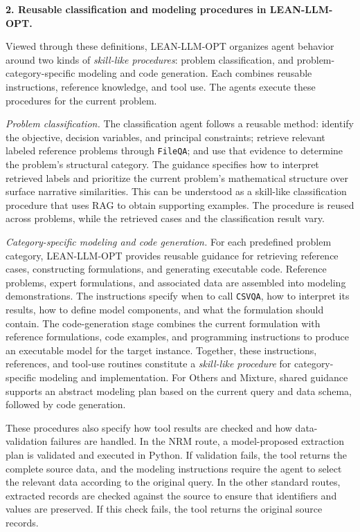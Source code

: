 {\medskip
\noindent\textbf{2. Reusable classification and modeling procedures in LEAN-LLM-OPT.}

Viewed through these definitions, LEAN-LLM-OPT organizes agent
behavior around two kinds of \emph{skill-like procedures}:
problem classification, and problem-category-specific modeling
and code generation. Each combines reusable instructions,
reference knowledge, and tool use. The agents execute these
procedures for the current problem.

\emph{Problem classification.}
The classification agent follows a reusable method: identify the
objective, decision variables, and principal constraints; retrieve
relevant labeled reference problems through \texttt{FileQA}; and
use that evidence to determine the problem's structural category.
The guidance specifies how to interpret retrieved labels and
prioritize the current problem's mathematical structure over
surface narrative similarities. This can be understood as a
skill-like classification procedure that uses RAG to obtain
supporting examples. The procedure is reused across problems,
while the retrieved cases and the classification result vary.

\emph{Category-specific modeling and code generation.}
For each predefined problem category, LEAN-LLM-OPT provides
reusable guidance for retrieving reference cases, constructing
formulations, and generating executable code. Reference problems,
expert formulations, and associated data are assembled into
modeling demonstrations. The instructions specify when to call
\texttt{CSVQA}, how to interpret its results, how to define model
components, and what the formulation should contain. The
code-generation stage combines the current formulation with
reference formulations, code examples, and programming instructions
to produce an executable model for the target instance. Together,
these instructions, references, and tool-use routines constitute
a \emph{skill-like procedure} for category-specific modeling and
implementation. For Others and Mixture, shared guidance supports
an abstract modeling plan based on the current query and data
schema, followed by code generation.

These procedures also specify how tool results are checked and
how data-validation failures are handled. In the NRM route, a
model-proposed extraction plan is validated and executed in Python.
If validation fails, the tool returns the complete source data,
and the modeling instructions require the agent to select the
relevant data according to the original query. In the other
standard routes, extracted records are checked against the source
to ensure that identifiers and values are preserved. If this
check fails, the tool returns the original source records.

}
